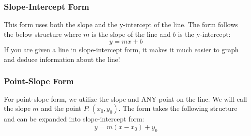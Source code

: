 \subsubsection{Slope-Intercept Form}
This form uses both the slope and the y-intercept of the line. The form follows the below structure where $m$ is the slope of the line and $b$ is the y-intercept:
$$
y = mx + b
$$
If you are given a line in slope-intercept form, it makes it much easier to graph and deduce information about the line!
\subsubsection{Point-Slope Form}
For point-slope form, we utilize the slope and ANY point on the line. We will call the slope $m$ and the point $P: (x_0,y_0)$. The form takes the following structure and can be expanded into slope-intercept form:
$$
y = m(x - x_0) + y_0
$$


